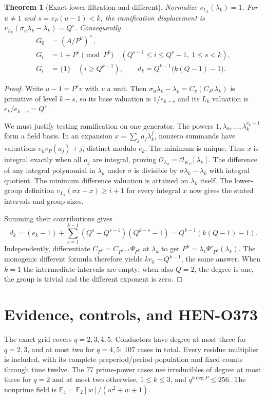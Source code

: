 \documentclass[10pt]{article}
\newtheorem{theorem}{Theorem}
\newcommand{\F}{\mathbb F}
\begin{document}
\begin{theorem}[Exact lower filtration and different]
Normalize $v_{L_k}(\lambda_k)=1$. For $u\ne1$ and
$s=v_P(u-1)<k$, the ramification displacement is
$v_{L_k}(\sigma_u\lambda_k-\lambda_k)=Q^s$. Consequently
\[
\begin{split}
 G_0&=(A/P^k)^\times,\\
 G_i&=1+P^s\pmod {P^k}
 \quad (Q^{s-1}\leq i\leq Q^s-1,\ 1\leq s<k),\\
 G_i&=\{1\}\quad(i\geq Q^{k-1}),\qquad
 d_k=Q^{k-1}\bigl(k(Q-1)-1\bigr).
\end{split}
\]
\end{theorem}
\begin{proof}
Write $u-1=P^sv$ with $v$ a unit. Then
$\sigma_u\lambda_k-\lambda_k=C_v(C_{P^s}\lambda_k)$ is primitive
of level $k-s$, so its base valuation is $1/e_{k-s}$ and its $L_k$
valuation is $e_k/e_{k-s}=Q^s$.

We must justify testing ramification on one generator. The powers
$1,\lambda_k,\ldots,\lambda_k^{e_k-1}$ form a field basis. In an
expansion $x=\sum_j a_j\lambda_k^j$, nonzero summands have valuations
$e_kv_P(a_j)+j$, distinct modulo $e_k$. The minimum is unique. Thus $x$
is integral exactly when all $a_j$ are integral, proving
$\mathcal O_{L_k}=\mathcal O_{K_P}[\lambda_k]$.
The difference of any integral polynomial in $\lambda_k$ under $\sigma$
is divisible by $\sigma\lambda_k-\lambda_k$ with integral quotient.
The minimum difference valuation is attained on $\lambda_k$ itself.
The lower-group definition $v_{L_k}(\sigma x-x)\geq i+1$ for every
integral $x$ now gives the stated intervals and group sizes.

Summing their contributions gives
\[
 d_k=(e_k-1)+\sum_{s=1}^{k-1}(Q^s-Q^{s-1})(Q^{k-s}-1)
     =Q^{k-1}(k(Q-1)-1).
\]
Independently, differentiate
$C_{P^k}=C_{P^{k-1}}\Psi_{P^k}$ at $\lambda_k$ to get
$P^k=\lambda_1\Psi'_{P^k}(\lambda_k)$. The monogenic different formula
therefore yields $ke_k-Q^{k-1}$, the same answer. When $k=1$ the
intermediate intervals are empty; when also $Q=2$, the degree is one,
the group is trivial and the different exponent is zero.
\end{proof}

\section{Evidence, controls, and HEN-O373}
The exact grid covers $q=2,3,4,5$. Conductors have degree at most three
for $q=2,3$, and at most two for $q=4,5$: 107 cases in total.
Every residue multiplier is included, with its complete preperiod/period
population and fixed counts through time twelve. The 77 prime-power cases
use irreducibles of degree at most three for $q=2$ and at most two otherwise,
$1\leq k\leq3$, and $q^{k\deg P}\leq256$.
The nonprime field is $\F_4=\F_2[w]/(w^2+w+1)$.
\end{document}
